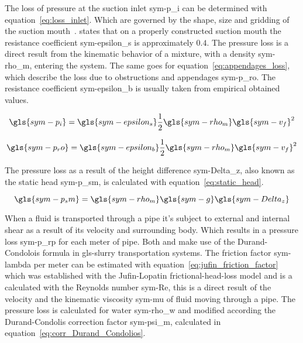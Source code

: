 \noindent The loss of pressure at the suction inlet \gls{sym-p_i} can be determined with equation~\ref{eq:loss_inlet}.
Which are governed by the shape, size and gridding of the suction mouth~\cite{van_den_berg_ihc_2013}.
\citet{van_den_berg_ihc_2013} states that on a properly constructed suction mouth the resistance coefficient
\gls{sym-epsilon_s} is approximately \( 0.4 \). The pressure loss is a direct result from the kinematic behavior of a
mixture, with a density \gls{sym-rho_m}, entering the system. The same goes for equation~\ref{eq:appendages_loss}, which
describe the loss due to obstructions and appendages \gls{sym-p_ro}. The resistance coefficient \gls{sym-epsilon_b} is
usually taken from empirical obtained values.

\begin{equation}
    \label{eq:loss_inlet}
    \gls{sym-p_i} = \gls{sym-epsilon_s} \frac{1}{2} \gls{sym-rho_m} \gls{sym-v_f}^2
\end{equation}

\begin{equation}
    \label{eq:appendages_loss}
    \gls{sym-p_ro} = \gls{sym-epsilon_b} \frac{1}{2} \gls{sym-rho_m} \gls{sym-v_f}^2
\end{equation}

\noindent The pressure loss as a result of the height difference \gls{sym-Delta_z}, also known as the static head
\gls{sym-p_sm}, is calculated with equation~\ref{eq:static_head}.

\begin{equation}
    \label{eq:static_head}
    \gls{sym-p_sm} = \gls{sym-rho_m} \gls{sym-g} \gls{sym-Delta_z}
\end{equation}

When a fluid is transported through a pipe it's subject to external and internal shear as a result of its velocity and
surrounding body. Which results in a pressure loss \gls{sym-p_rp} for each meter of pipe. Both
\citet{van_den_berg_ihc_2013} and \citet{miedema_slurry_2016} make use of the Durand-Condolois formula in
\gls{gls-slurry} transportation systems. The friction factor \gls{sym-lambda} per meter can be estimated with
equation~\ref{eq:jufin_friction_factor} which was established with the Jufin-Lopatin frictional-head-loss model and is a
calculated with the Reynolds number \gls{sym-Re}, this is a direct result of the velocity and the kinematic viscosity
\gls{sym-mu} of fluid moving through a pipe. The pressure loss is calculated for water \gls{sym-rho_w} and modified
according the Durand-Condolis correction factor \gls{sym-psi_m}, calculated in equation~\ref{eq:corr_Durand_Condolios}.

